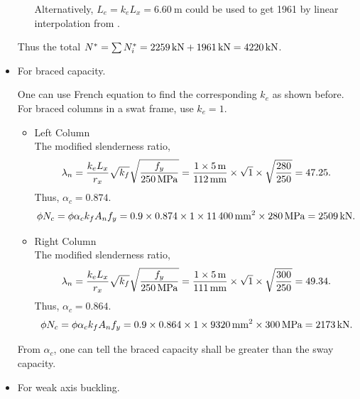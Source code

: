\begin{solution}
\begin{itemize}
\begin{itemize}
Alternatively, $L_e=k_eL_x=\SI{6.60}{\m}$ could be used to get \SI{1961}{\kn} by linear interpolation from .
\end{itemize}
Thus the total $N^*=\sum{}N^*_i=\SI{2259}{\kilo\newton}+\SI{1961}{\kilo\newton}=\SI{4220}{\kilo\newton}$.
\item For braced capacity.

One can use French equation to find the corresponding $k_e$ as shown before. For braced columns in a swat frame, use $k_e=1$.
\begin{itemize}
\item Left Column\\
The modified slenderness ratio,
\begin{gather*}
\lambda_n=\dfrac{k_eL_x}{r_x}\sqrt{k_f}\sqrt{\dfrac{f_y}{\SI{250}{\mega\pascal}}}=\dfrac{1\times\SI{5}{\meter}}{\SI{112}{\milli\meter}}\times\sqrt{1}\times\sqrt{\dfrac{280}{250}}=47.25.
\end{gather*}
Thus, $\alpha_c=0.874$.
\begin{gather*}
\phi{}N_c=\phi\alpha_ck_fA_nf_y=0.9\times0.874\times1\times\SI{11400}{\milli\meter^2}\times\SI{280}{\mega\pascal}=\SI{2509}{\kilo\newton}.
\end{gather*}
\item Right Column\\
The modified slenderness ratio,
\begin{gather*}
\lambda_n=\dfrac{k_eL_x}{r_x}\sqrt{k_f}\sqrt{\dfrac{f_y}{\SI{250}{\mega\pascal}}}=\dfrac{1\times\SI{5}{\meter}}{\SI{111}{\milli\meter}}\times\sqrt{1}\times\sqrt{\dfrac{300}{250}}=49.34.
\end{gather*}
Thus, $\alpha_c=0.864$.
\begin{gather*}
\phi{}N_c=\phi\alpha_ck_fA_nf_y=0.9\times0.864\times1\times\SI{9320}{\milli\meter^2}\times\SI{300}{\mega\pascal}=\SI{2173}{\kilo\newton}.
\end{gather*}
\end{itemize}
From $\alpha_c$, one can tell the braced capacity shall be greater than the sway capacity.
\item For weak axis buckling.


\end{itemize}
\end{solution}
